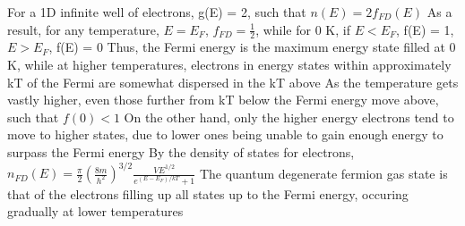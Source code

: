 \documentclass[11 pt, twoside]{article}
\newenvironment{outline*}
{
	\begin{outline}[enumerate]
	}
	{\end{outline}
}
\begin{document}
\begin{outline*}
		\3 For a 1D infinite well of electrons, g(E) = 2, such that $n(E) = 2f_{FD}(E)$
		\3 As a result, for any temperature, $E = E_F$, $f_{FD} = \frac{1}{2}$, while for 0 K, if $E < E_F$, f(E) = 1, $E > E_F$, f(E) = 0
		\3 Thus, the Fermi energy is the maximum energy state filled at 0 K, while at higher temperatures, electrons in energy states within approximately kT of the Fermi are somewhat dispersed in the kT above
			\4 As the temperature gets vastly higher, even those further from kT below the Fermi energy move above, such that $f(0) < 1$
			\4 On the other hand, only the higher energy electrons tend to move to higher states, due to lower ones being unable to gain enough energy to surpass the Fermi energy
		\3 By the density of states for electrons, $n_{FD}(E) = \frac{\pi}{2}(\frac{8m}{h^2})^{3/2}\frac{VE^{1/2}}{e^{(E - E_F)/kT} + 1}$
	\2 The quantum degenerate fermion gas state is that of the electrons filling up all states up to the Fermi energy, occuring gradually at lower temperatures
\end{outline*}
\end{document}

